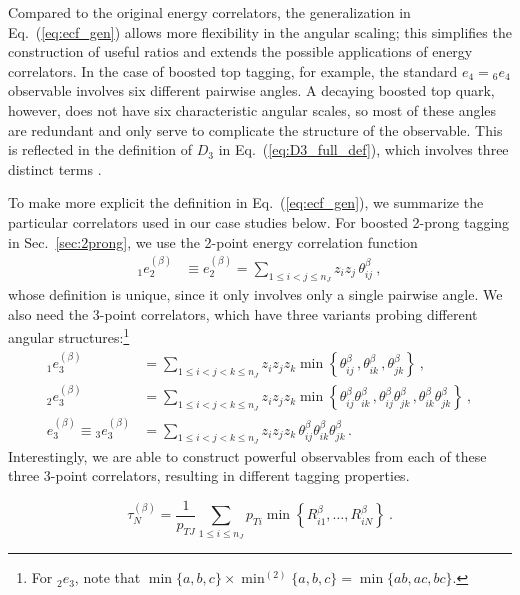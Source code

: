 \documentclass[11pt,letterpaper]{article}
\DeclareRobustCommand{\Sec}[1]{Sec.~\ref{#1}}
\DeclareRobustCommand{\Eq}[1]{Eq.~(\ref{#1})}
\newcommand{\ecf}[2]{e_{#1}^{(#2)}}
\newcommand{\ecfnobeta}[1]{e_{#1}}
\newcommand{\ecfvar}[3]{{_{#1}e_{#2}^{(#3)}}}
\newcommand{\ecfvarnobeta}[2]{{_{#1}e_{#2}}}
\newcommand{\Dobsnobeta}[1]{D_{#1}}
\newcommand{\Nsub}[2]{\tau_{#1}^{(#2)}}
\begin{document}
Compared to the original energy correlators, the generalization in \Eq{eq:ecf_gen} allows more flexibility in the angular scaling; this simplifies the construction of useful ratios and extends the possible applications of energy correlators.  In the case of boosted top tagging, for example, the standard $\ecfnobeta{4}=\ecfvarnobeta{6}{4}$ observable involves six different pairwise angles.  A decaying boosted top quark, however, does not have six characteristic angular scales, so most of these angles are redundant and only serve to complicate the structure of the observable.  This is reflected in the definition of $\Dobsnobeta{3}$ in \Eq{eq:D3_full_def}, which involves three distinct terms \cite{Larkoski:2014zma}.

To make more explicit the definition in \Eq{eq:ecf_gen}, we summarize the particular correlators used in our case studies below.  For boosted 2-prong tagging in \Sec{sec:2prong}, we use the 2-point energy correlation function
\begin{align}\label{eq:explicit_twopointvar}
\ecfvar{1}{2}{\beta}&\equiv\ecf{2}{\beta}=\sum_{1\leq i<j\leq n_J} z_{i}z_{j} \, \theta_{ij}^\beta\ ,
\end{align}
whose definition is unique, since it only involves only a single pairwise angle.  We also need the 3-point correlators, which have three variants probing different angular structures:\footnote{For $\ecfvarnobeta{2}{3}$, note that $\min\{{a,b,c}\} \times \min^{(2)} \{a,b,c\} = \min\{ab,ac,bc\}$.}
\begin{align}\label{eq:explicit_ecfvar}
\ecfvar{1}{3}{\beta}&=\sum_{1\leq i<j<k\leq n_J} z_{i}z_{j}z_{k} \min \left\{ \theta_{ij}^\beta\,,  \theta_{ik}^\beta\,, \theta_{jk}^\beta  \right\} \ , \nonumber \\
\ecfvar{2}{3}{\beta}&=\sum_{1\leq i<j<k\leq n_J} z_{i}z_{j}z_{k} \min \left\{\theta_{ij}^\beta \theta_{ik}^\beta\,, \theta_{ij}^\beta  \theta_{jk}^\beta\,,     \theta_{ik}^\beta \theta_{jk}^\beta    \right\}  \ , \nonumber \\
\ecf{3}{\beta}\equiv\ecfvar{3}{3}{\beta}&=\sum_{1\leq i<j<k\leq n_J} z_{i}z_{j}z_{k} \, \theta_{ij}^\beta \theta_{ik}^\beta \theta_{jk}^\beta \,.
\end{align}
Interestingly, we are able to construct powerful observables from each of these three 3-point correlators, resulting in different tagging properties.


\cite{Thaler:2011gf}\cite{Thaler:2010tr}

\begin{equation}\label{eq:nsubdef}
\Nsub{N}{\beta} = \frac{1}{p_{TJ}}\sum_{1\leq i \leq n_J} p_{Ti}\min\left\{
R_{i1}^\beta,\dotsc,R_{iN}^\beta
\right\} \ .
\end{equation}
\end{document}
